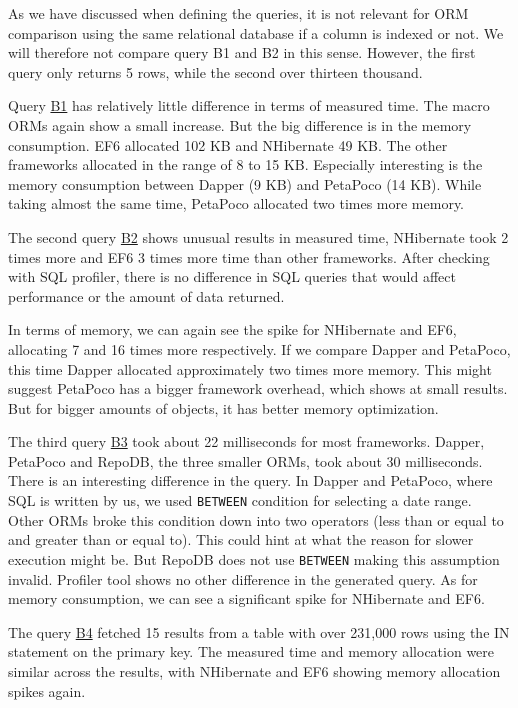 As we have discussed when defining the queries, it is not relevant for ORM comparison using the same relational database if a column is indexed or not. We will therefore not compare query B1 and B2 in this sense. However, the first query only returns 5 rows, while the second over thirteen thousand.

Query \hyperref[query:b1]{B1} has relatively little difference in terms of measured time. The macro ORMs again show a small increase. But the big difference is in the memory consumption. EF6 allocated 102 KB and NHibernate 49 KB. The other frameworks allocated in the range of 8 to 15 KB.
Especially interesting is the memory consumption between Dapper (9 KB) and PetaPoco (14 KB). While taking almost the same time, PetaPoco allocated two times more memory. 

The second query \hyperref[query:b2]{B2} shows unusual results in measured time, NHibernate took 2 times more and EF6 3 times more time than other frameworks. After checking with SQL profiler, there is no difference in SQL queries that would affect performance or the amount of data returned.

In terms of memory, we can again see the spike for NHibernate and EF6, allocating 7 and 16 times more respectively. If we compare Dapper and PetaPoco, this time Dapper allocated approximately two times more memory. 
This might suggest PetaPoco has a bigger framework overhead, which shows at small results. But for bigger amounts of objects, it has better memory optimization. 

The third query \hyperref[query:b3]{B3} took about 22 milliseconds for most frameworks. Dapper, PetaPoco and RepoDB, the three smaller ORMs, took about 30 milliseconds. There is an interesting difference in the query. In Dapper and PetaPoco, where SQL is written by us, we used \texttt{BETWEEN} condition for selecting a date range. Other ORMs broke this condition down into two operators (less than or equal to and greater than or equal to). This could hint at what the reason for slower execution might be. But RepoDB does not use \texttt{BETWEEN} making this assumption invalid. Profiler tool shows no other difference in the generated query. As for memory consumption, we can see a significant spike for NHibernate and EF6.

The query \hyperref[query:b4]{B4} fetched 15 results from a table with over 231,000 rows using the IN statement on the primary key. The measured time and memory allocation were similar across the results, with NHibernate and EF6 showing memory allocation spikes again. 

